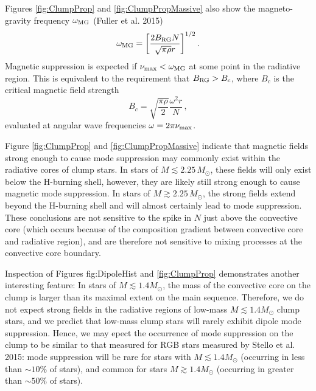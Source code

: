Figures \ref{fig:ClumpProp} and \ref{fig:ClumpPropMassive} also show the magneto-gravity frequency $\omega_{\rm MG}$ (Fuller et al. 2015)
\begin{equation}
\label{eqn:omegaMG}
\omega_{\rm MG} = \bigg[ \frac{ 2 B_{\rm RG} N}{\sqrt{\pi \rho} r} \bigg]^{1/2} \, .
\end{equation}
Magnetic suppression is expected if $\nu_{\rm max} < \omega_{\rm MG}$ at some point in the radiative region. This is equivalent to the requirement that $B_{\rm RG} > B_c$, where $B_c$ is the critical magnetic field strength
\begin{equation}
\label{eqn:Bc}
B_c = \sqrt{ \frac{ \pi \rho}{2} } \frac{\omega^2 r}{N} \, ,
\end{equation}
evaluated at angular wave frequencies $\omega = 2 \pi \nu_{\rm max}$. 

Figure \ref{fig:ClumpProp} and \ref{fig:ClumpPropMassive} indicate that magnetic fields strong enough to cause mode suppression may commonly exist within the radiative cores of clump stars. In stars of $M \lesssim 2.25 \, M_\odot$, these fields will only exist below the H-burning shell, however, they are likely still strong enough to cause magnetic mode suppression. In stars of $M \gtrsim 2.25 \, M_\odot$, the strong fields extend beyond the H-burning shell and will almost certainly lead to mode suppression. These conclusions are not sensitive to the spike in $N$ just above the convective core (which occurs because of the composition gradient between convective core and radiative region), and are therefore not sensitive to mixing processes at the convective core boundary. 

Inspection of Figures {fig:DipoleHist} and \ref{fig:ClumpProp} demonstrates another interesting feature: In stars of $M \lesssim 1.4 M_\odot$, the mass of the convective core on the clump is larger than its maximal extent on the main sequence. Therefore, we do not expect strong fields in the radiative regions of low-mass $M \lesssim 1.4 M_\odot$ clump stars, and we predict that low-mass clump stars will rarely exhibit dipole mode suppression. Hence, we may epect the occurrence of mode suppression on the clump to be similar to that measured for RGB stars measured by Stello et al. 2015: mode suppression will be rare for stars with $M \lesssim 1.4 M_\odot$ (occurring in less than $\sim \! 10 \%$ of stars), and common for stars $M \gtrsim 1.4 M_\odot$ (occurring in greater than $\sim \! 50 \%$ of stars). 
    
    
    